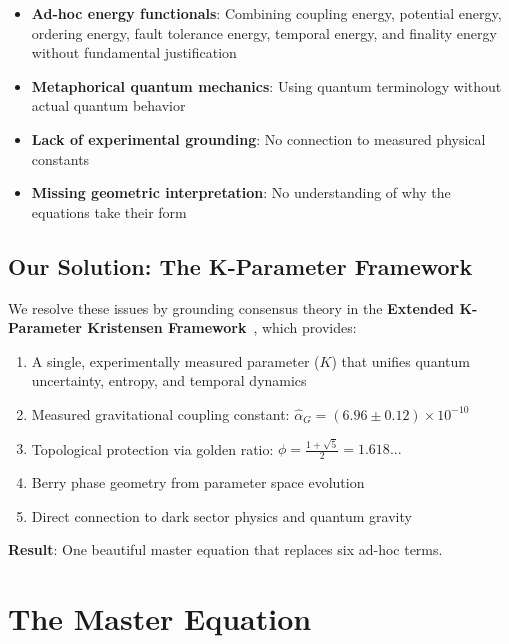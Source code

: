 \documentclass[11pt,a4paper,twoside]{article}
\begin{document}
\begin{itemize}
    \item \textbf{Ad-hoc energy functionals}: Combining coupling energy, potential energy, ordering energy, fault tolerance energy, temporal energy, and finality energy without fundamental justification
    \item \textbf{Metaphorical quantum mechanics}: Using quantum terminology without actual quantum behavior
    \item \textbf{Lack of experimental grounding}: No connection to measured physical constants
    \item \textbf{Missing geometric interpretation}: No understanding of why the equations take their form
\end{itemize}

\subsection{Our Solution: The K-Parameter Framework}

We resolve these issues by grounding consensus theory in the \textbf{Extended K-Parameter Kristensen Framework}~\cite{kparameter2025}, which provides:

\begin{enumerate}
    \item A single, experimentally measured parameter ($K$) that unifies quantum uncertainty, entropy, and temporal dynamics
    \item Measured gravitational coupling constant: $\hat{\alpha}_G = (6.96 \pm 0.12) \times 10^{-10}$
    \item Topological protection via golden ratio: $\phi = \frac{1 + \sqrt{5}}{2} = 1.618...$
    \item Berry phase geometry from parameter space evolution
    \item Direct connection to dark sector physics and quantum gravity
\end{enumerate}

\textbf{Result}: One beautiful master equation that replaces six ad-hoc terms.

\newpage

\section{The Master Equation}
\end{document}
